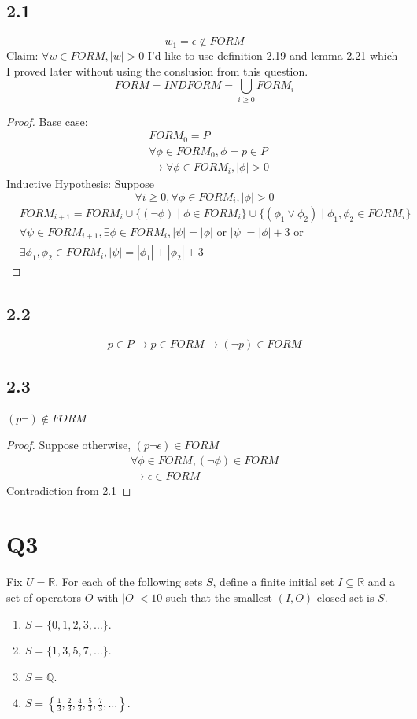 \documentclass{article}
\begin{document}
\subsection*{2.1}
\[w_1 = \epsilon \notin FORM\]
Claim: $\forall w \in FORM, |w| > 0$
I'd like to use definition 2.19 and lemma 2.21 which I proved later without using the conslusion from this question.
\[FORM = INDFORM = \bigcup_{i \geq 0}FORM_i\]
\begin{proof}
    Base case:
    \begin{align*}
        &FORM_0 = P\\
        &\forall \phi \in FORM_0, \phi = p \in P\\
        &\rightarrow \forall \phi \in FORM_i, |\phi| > 0
    \end{align*}
    Inductive Hypothesis: Suppose 
    \[\forall i \geq 0, \forall \phi \in FORM_i, |\phi| > 0\]
    \begin{align*}
        &FORM_{i+1} = FORM_i \cup \{(\neg \phi) \mid \phi \in FORM_i\} \cup \{(\phi_1 \lor \phi_2) \mid \phi_1, \phi_2 \in FORM_i\}\\
        &\forall \psi \in FORM_{i+1}, \exists \phi \in FORM_{i}, |\psi| = |\phi| \text{ or } |\psi| = |\phi| + 3 \text{ or } \\
        &\exists \phi_1, \phi_2 \in FORM_i, |\psi| = |\phi_1| + |\phi_2| + 3
    \end{align*}

\end{proof}
\subsection*{2.2}
\[ p \in P \rightarrow p \in FORM \rightarrow (\neg p)\in FORM\]
\subsection*{2.3}
$(p \neg) \not \in FORM$
\begin{proof}
    Suppose otherwise, $(p \neg \epsilon) \in FORM$
    \begin{align*}
        \forall \phi \in FORM, (\neg \phi) \in FORM\\
        \rightarrow \epsilon \in FORM 
    \end{align*}
    Contradiction from 2.1
\end{proof}
\section*{Q3}
Fix $U = \mathbb{R}$. For each of the following sets $S$, define a finite initial set $I \subseteq \mathbb{R}$
and a set of operators $O$ with $|O| < 10$ such that the smallest $(I,O)$-closed set is $S$.
\begin{enumerate}
  \item $S = \{0,1,2,3,\dots\}$.
  \item $S = \{1,3,5,7,\dots\}$.
  \item $S = \mathbb{Q}$.
  \item $S = \left\{\frac{1}{3},\frac{2}{3},\frac{4}{3},\frac{5}{3},\frac{7}{3},\dots\right\}$.
\end{enumerate}
\end{document}
